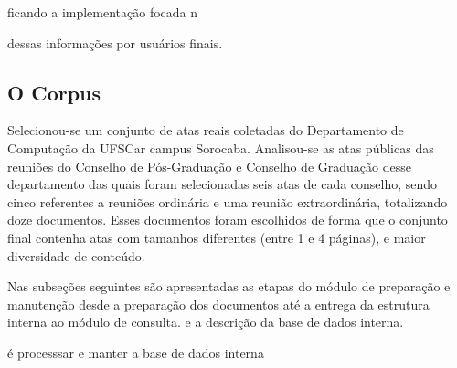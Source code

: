 ficando a implementação focada n

dessas informações por usuários finais.







\subsection{O Corpus}


Selecionou-se um conjunto de atas reais coletadas do Departamento de Computação da UFSCar campus Sorocaba. Analisou-se as atas públicas das reuniões do Conselho de Pós-Graduação e Conselho de Graduação desse departamento das quais foram selecionadas seis atas de cada conselho, sendo cinco referentes a reuniões ordinária e uma reunião extraordinária, totalizando doze documentos. Esses documentos foram escolhidos de forma que o conjunto final contenha atas com tamanhos diferentes (entre 1 e 4 páginas), e maior diversidade de conteúdo.






Nas subseções seguintes são apresentadas as etapas do módulo de preparação e manutenção desde a preparação dos documentos até a entrega da estrutura interna ao módulo de consulta. 
e a descrição da base de dados interna.
















 é processsar e manter a base de dados interna











